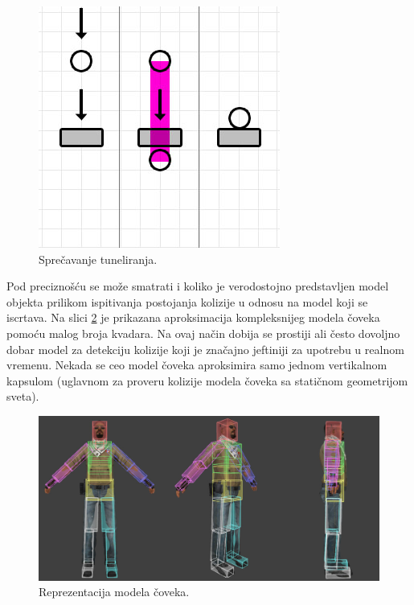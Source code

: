 \documentclass[12pt,oneside]{memoir}
\begin{document}
\begin{figure}[h!]
	\begin{center}
	\includegraphics[scale=0.55]{tunnel_fixed.png}
	\end{center}
	\caption{Sprečavanje tuneliranja.}
	\label{fig:tunnel_fix}
\end{figure}

Pod preciznošću se može smatrati i koliko je verodostojno predstavljen model objekta prilikom ispitivanja postojanja kolizije u odnosu 
na model koji se iscrtava.
Na slici \ref{fig:hitbox} je prikazana aproksimacija kompleksnijeg modela čoveka pomoću malog broja kvadara.
Na ovaj način dobija se prostiji ali često dovoljno dobar model za detekciju kolizije koji je značajno 
jeftiniji za upotrebu u realnom vremenu. 
Nekada se ceo model čoveka aproksimira samo jednom vertikalnom kapsulom
(uglavnom za proveru kolizije modela čoveka sa statičnom geometrijom sveta). 

\begin{figure}[h!]
	\begin{center}
	\includegraphics[scale=0.55]{hitbox.png}
	\end{center}
	\caption{Reprezentacija modela čoveka.}
	\label{fig:hitbox}
\end{figure}
\end{document}
